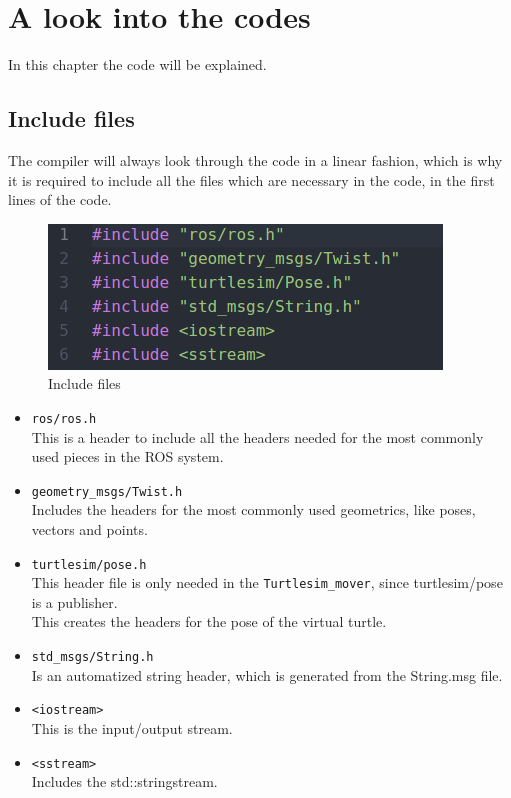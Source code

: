 \chapter{A look into the codes} \label{ch:lookinto}

In this chapter the code will be explained.\\

\section{Include files} 

The compiler will always look through the code in a linear fashion, which is why it is required to include all the files which are necessary in the code, in the first lines of the code.\\

\begin{figure}[h]
\begin{center}
\includegraphics[width=.5\textwidth]{figures/therealinclude.png}
\caption{Include files}
\end{center}
\end{figure}\label{fig:include}

\begin{itemize}
\item \texttt{ros/ros.h}\\
This is a header to include all the headers needed for the most commonly used pieces in the ROS system.\\
\item \texttt{geometry\_msgs/Twist.h}\\
Includes the headers for the most commonly used geometrics, like poses, vectors and points.\\
\item \texttt{turtlesim/pose.h}\\
This header file is only needed in the \texttt{Turtlesim\_mover}, since turtlesim/pose is a publisher.\\
This creates the headers for the pose of the virtual turtle.\\
\item \texttt{std\_msgs/String.h}\\
Is an automatized string header, which is generated from the String.msg file.\\
\item \texttt{<iostream>}\\
This is the input/output stream.\\
\item \texttt{<sstream>}\\
Includes the std::stringstream.\\

\end{itemize}


